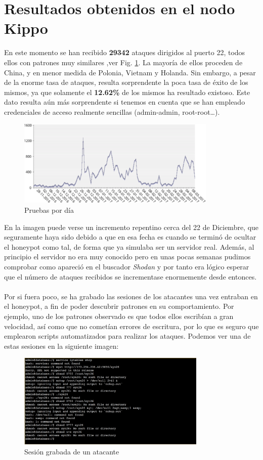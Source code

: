 \documentclass[journal]{IEEEtran}
\begin{document}
\section{Resultados obtenidos en el nodo Kippo}
En este momento se han recibido \textbf{29342} ataques dirigidos al puerto 22, todos ellos con patrones muy similares ,ver Fig. \ref{fig:pruebas_dia}. La mayoría de ellos proceden de China, y en menor medida de Polonia, Vietnam y Holanda. Sin embargo, a pesar de la enorme tasa de ataques, resulta sorprendente la poca tasa de éxito de los mismos, ya que solamente el \textbf{12.62\%} de los mismos ha resultado existoso. Este dato resulta aún más sorprendente si tenemos en cuenta que se han empleado credenciales de acceso realmente sencillas (admin-admin, root-root…).
\begin{figure}[H]
\centerline{
\includegraphics[width=9.5cm]{img/pruebas_dia}
}
\caption{Pruebas por día}
\label{fig:pruebas_dia}
\end{figure}
En la imagen puede verse un incremento repentino cerca del 22 de Diciembre, que seguramente haya sido debido a que en esa fecha es cuando se terminó de ocultar el honeypot como tal, de forma que ya simulaba ser un servidor real. Además, al principio el servidor no era muy conocido pero en unas pocas semanas pudimos comprobar como apareció en el buscador \textit{Shodan} y por tanto era lógico esperar que el número de ataques recibidos se incrementase enormemente desde entonces.
\\\\
Por si fuera poco, se ha grabado las sesiones de los atacantes una vez entraban en el honeypot, a fin de poder descubrir patrones en su comportamiento. Por ejemplo, uno de los patrones observado es que todos ellos escribían a gran velocidad, así como que no cometían errores de escritura, por lo que es seguro que emplearon scripts automatizados para realizar los ataques. Podemos ver una de estas sesiones en la siguiente imagen:
\begin{figure}[H]
\centerline{
\includegraphics[width=9cm]{img/session}
}
\caption{Sesión grabada de un atacante}
\label{fig:session}
\end{figure}
\end{document}

